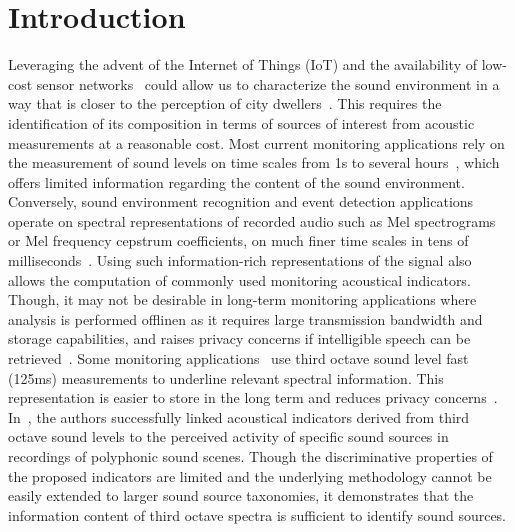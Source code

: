 \documentclass[twocolumn]{article}
\begin{document}
\section{Introduction}
\label{sec:intro}


Leveraging the advent of the Internet of Things (IoT) and the availability of low-cost sensor networks~\cite{ardouin2018, mydlarz2017} could allow us to characterize the sound environment in a way that is closer to the perception of city dwellers~\cite{iso2014}. This requires the identification of its composition in terms of sources of interest from acoustic measurements at a reasonable cost. Most current monitoring applications rely on the measurement of sound levels on time scales from 1s to several hours~\cite{can2008, brocolini2013, nilsson2006}, which offers limited information regarding the content of the sound environment. Conversely, sound environment recognition and event detection applications operate on spectral representations of recorded audio such as Mel spectrograms or Mel frequency cepstrum coefficients, on much finer time scales in tens of milliseconds~\cite{lunden2016, aucouturier2007, cakir2015}. Using such information-rich representations of the signal also allows the computation of commonly used monitoring acoustical indicators. Though, it may not be desirable in long-term monitoring applications where analysis is performed offlinen as it requires large transmission bandwidth and storage capabilities, and raises privacy concerns if intelligible speech can be retrieved~\cite{gontier2017}. Some monitoring applications~\cite{aumond2017, torija2013, nilsson2007} use third octave sound level fast (125ms) measurements to underline relevant spectral information. This representation is easier to store in the long term and reduces privacy concerns~\cite{gontier2017}. In~\cite{aumond2017}, the authors successfully linked acoustical indicators derived from third octave sound levels to the perceived activity of specific sound sources in recordings of polyphonic sound scenes. Though the discriminative properties of the proposed indicators are limited and the underlying methodology cannot be easily extended to larger sound source taxonomies, it demonstrates that the information content of third octave spectra is sufficient to identify sound sources.
\end{document}
